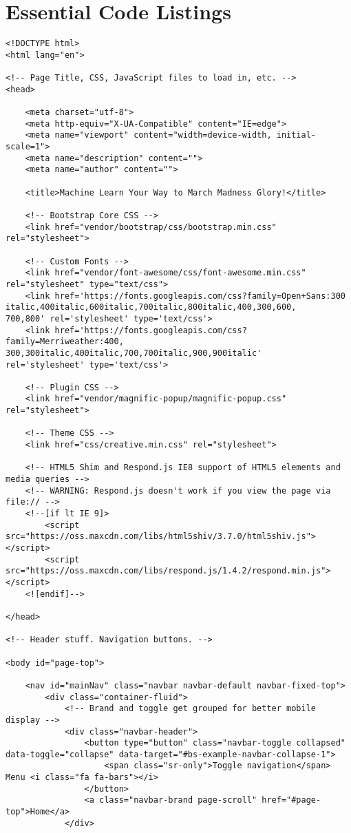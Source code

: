 \documentclass[onecolumn, draftclsnofoot,10pt, compsoc]{IEEEtran}
\begin{document}
\section{Essential Code Listings}
\label{EssentialCodeListings}
\begin{lstlisting}[caption={MachineLearnYourWayToMarchMadnessGlory.html. The graphical user interface that provides users information on how to engage with the module, a link to the module, and information about our project.}]
<!DOCTYPE html>
<html lang="en">

<!-- Page Title, CSS, JavaScript files to load in, etc. -->
<head>

    <meta charset="utf-8">
    <meta http-equiv="X-UA-Compatible" content="IE=edge">
    <meta name="viewport" content="width=device-width, initial-scale=1">
    <meta name="description" content="">
    <meta name="author" content="">

    <title>Machine Learn Your Way to March Madness Glory!</title>

    <!-- Bootstrap Core CSS -->
    <link href="vendor/bootstrap/css/bootstrap.min.css" rel="stylesheet">

    <!-- Custom Fonts -->
    <link href="vendor/font-awesome/css/font-awesome.min.css" rel="stylesheet" type="text/css">
    <link href='https://fonts.googleapis.com/css?family=Open+Sans:300
italic,400italic,600italic,700italic,800italic,400,300,600,
700,800' rel='stylesheet' type='text/css'>
    <link href='https://fonts.googleapis.com/css?family=Merriweather:400,
300,300italic,400italic,700,700italic,900,900italic' 
rel='stylesheet' type='text/css'>

    <!-- Plugin CSS -->
    <link href="vendor/magnific-popup/magnific-popup.css" rel="stylesheet">

    <!-- Theme CSS -->
    <link href="css/creative.min.css" rel="stylesheet">

    <!-- HTML5 Shim and Respond.js IE8 support of HTML5 elements and media queries -->
    <!-- WARNING: Respond.js doesn't work if you view the page via file:// -->
    <!--[if lt IE 9]>
        <script src="https://oss.maxcdn.com/libs/html5shiv/3.7.0/html5shiv.js"></script>
        <script src="https://oss.maxcdn.com/libs/respond.js/1.4.2/respond.min.js"></script>
    <![endif]-->

</head>

<!-- Header stuff. Navigation buttons. -->

<body id="page-top">

    <nav id="mainNav" class="navbar navbar-default navbar-fixed-top">
        <div class="container-fluid">
            <!-- Brand and toggle get grouped for better mobile display -->
            <div class="navbar-header">
                <button type="button" class="navbar-toggle collapsed" 
data-toggle="collapse" data-target="#bs-example-navbar-collapse-1">
                    <span class="sr-only">Toggle navigation</span> Menu <i class="fa fa-bars"></i>
                </button>
                <a class="navbar-brand page-scroll" href="#page-top">Home</a>
            </div>


\end{lstlisting}
\end{document}
